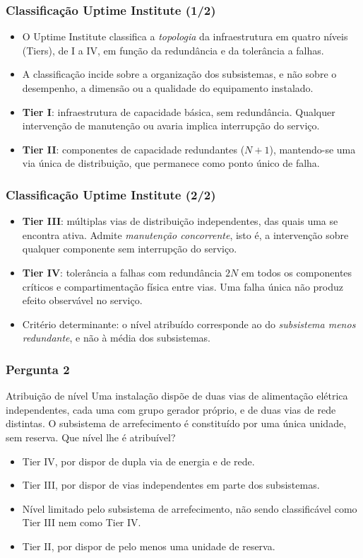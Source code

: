 \documentclass[aspectratio=169]{beamer}
\begin{document}
\begin{frame}
\frametitle{Classificação Uptime Institute \textcolor{NudeTaupe}{\small(1/2)}}
\begin{itemize}
    \setlength\itemsep{0.4cm}
    \item O Uptime Institute classifica a \emph{topologia} da infraestrutura em quatro níveis (Tiers), de I a IV, em função da redundância e da tolerância a falhas.
    \item A classificação incide sobre a organização dos subsistemas, e não sobre o desempenho, a dimensão ou a qualidade do equipamento instalado.
    \item \textbf{Tier I}: infraestrutura de capacidade básica, sem redundância. Qualquer intervenção de manutenção ou avaria implica interrupção do serviço.
    \item \textbf{Tier II}: componentes de capacidade redundantes ($N+1$), mantendo-se uma via única de distribuição, que permanece como ponto único de falha.
\end{itemize}
\end{frame}

\begin{frame}
\frametitle{Classificação Uptime Institute \textcolor{NudeTaupe}{\small(2/2)}}
\begin{itemize}
    \setlength\itemsep{0.4cm}
    \item \textbf{Tier III}: múltiplas vias de distribuição independentes, das quais uma se encontra ativa. Admite \emph{manutenção concorrente}, isto é, a intervenção sobre qualquer componente sem interrupção do serviço.
    \item \textbf{Tier IV}: tolerância a falhas com redundância $2N$ em todos os componentes críticos e compartimentação física entre vias. Uma falha única não produz efeito observável no serviço.
    \item Critério determinante: o nível atribuído corresponde ao do \emph{subsistema menos redundante}, e não à média dos subsistemas.
\end{itemize}
\end{frame}

\begin{frame}
\frametitle{Pergunta 2}
\begin{pergunta}{Atribuição de nível}
Uma instalação dispõe de duas vias de alimentação elétrica independentes, cada uma com grupo gerador próprio, e de duas vias de rede distintas. O subsistema de arrefecimento é constituído por uma única unidade, sem reserva. Que nível lhe é atribuível?
\begin{itemize}
    \item[A)] Tier IV, por dispor de dupla via de energia e de rede.
    \item[B)] Tier III, por dispor de vias independentes em parte dos subsistemas.
    \item[C)] Nível limitado pelo subsistema de arrefecimento, não sendo classificável como Tier III nem como Tier IV.
    \item[D)] Tier II, por dispor de pelo menos uma unidade de reserva.
\end{itemize}
\end{pergunta}
\end{frame}
\end{document}
